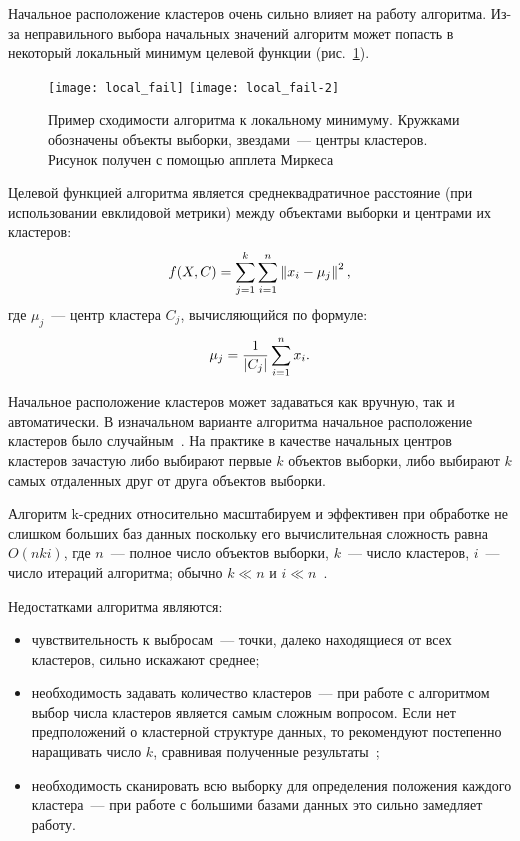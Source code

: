Начальное расположение кластеров очень сильно влияет на работу алгоритма. Из-за неправильного выбора начальных значений алгоритм может попасть в некоторый локальный минимум целевой функции (рис.~\ref{pic:local_fail}).

\begin{figure}[ht!]
    \centering
    \texttt{[image: local\_fail]} \hspace{1em}
    \texttt{[image: local\_fail-2]} \\[1ex]
    \parbox{.9\textwidth}{\caption{Пример сходимости алгоритма к локальному минимуму. Кружками обозначены объекты выборки, звездами~--- центры кластеров. Рисунок получен с помощью апплета Миркеса~\cite{mirkes}} \label{pic:local_fail}}
\end{figure}

Целевой функцией алгоритма является среднеквадратичное расстояние (при использовании евклидовой метрики) между объектами выборки и центрами их кластеров:
\[
    f(X, C) = \sum_{j=1}^k \sum_{i=1}^n \left\|x_i - \mu_j\right\|^2,
\]
где \( \mu_j \)~--- центр кластера \( C_j \), вычисляющийся по формуле:
\begin{equation}
    \mu_j = \frac{1}{\left|C_j\right|} \sum_{i=1}^n x_i.
    \label{eq:km-mu}
\end{equation}

Начальное расположение кластеров может задаваться как вручную, так и автоматически. В изначальном варианте алгоритма начальное расположение кластеров было случайным~\cite{macqueen}. На практике в качестве начальных центров кластеров зачастую либо выбирают первые \( k \) объектов выборки, либо выбирают \( k \) самых отдаленных друг от друга объектов выборки.

Алгоритм k-средних относительно масштабируем и эффективен при обработке не слишком больших баз данных поскольку его вычислительная сложность равна \( O(nki) \), где \( n \)~--- полное число объектов выборки, \( k \)~--- число кластеров, \( i \)~--- число итераций алгоритма; обычно \( k\ll n \) и \( i\ll n \)~\cite{cod}.

Недостатками алгоритма являются:
\begin{itemize}
    \item чувствительность к выбросам~--- точки, далеко находящиеся от всех кластеров, сильно искажают среднее;
    \item необходимость задавать количество кластеров~--- при работе с алгоритмом выбор числа кластеров является самым сложным вопросом. Если нет предположений о кластерной структуре данных, то рекомендуют постепенно наращивать число \( k \), сравнивая полученные результаты~\cite{neiskiy};
    \item необходимость сканировать всю выборку для определения положения каждого кластера~--- при работе с большими базами данных это сильно замедляет работу.
\end{itemize}

